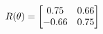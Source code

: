 \documentclass[preview]{standalone}
\begin{document}
\begin{align*}
\special{dvisvgm:raw <g id='unique000'>}R(\theta) = \begin{bmatrix}0.75 & 0.66\\-0.66 & 0.75\end{bmatrix}\special{dvisvgm:raw </g>}
\end{align*}
\end{document}
